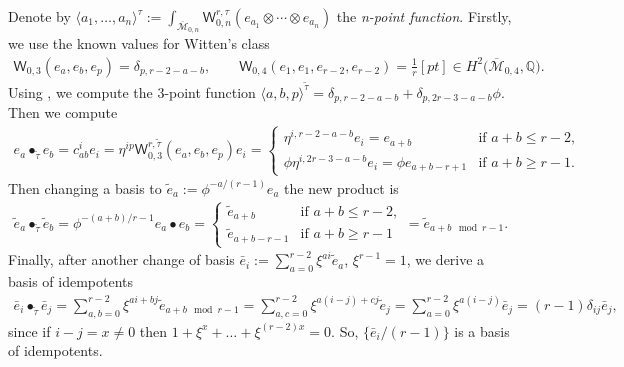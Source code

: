 \documentclass[10pt,a4paper]{amsart}
\def\oM{\overline{\mathcal{M}}}
\def\W{\mathsf{W}}
\numberwithin{equation}{section}
\begin{document}
\begin{Example}
Denote by $\langle a_1,\dots,a_n\rangle^{\tau}:= \int_{\oM_{0,n}}\W_{0,n}^{r,\tau}(e_{a_1} \otimes \cdots \otimes e_{a_n})$ the \emph{n-point function}.
Firstly, we use the known values for Witten's class
\begin{align*}
 \W_{0,3}(e_a,e_b,e_p)=\delta_{p,r-2-a-b}, \qquad \W_{0,4}(e_1,e_1,e_{r-2},e_{r-2})=\frac{1}{r}[pt]\in H^2\big(\oM_{0,4},\mathbb{Q}\big).
\end{align*}
Using \cite[Proposition 4.1]{PPZ16},
we compute the 3-point function
$\langle a,b,p\rangle^{\widetilde{\tau}}\! =\! \delta_{p,r-2-a-b}+\delta_{p,2r-3-a-b}\phi$.
Then we compute
\begin{align*}
e_{a} \bullet_{\widetilde{\tau}} e_{b} = c^{i}_{ab}e_i=\eta^{ip}\W_{0,3}^{r,\widetilde{\tau}}(e_a,e_b,e_p)e_i
=
\begin{cases}
\eta^{i, r-2-a-b} e_i = e_{a+b}& \text{if } a+b \leq r-2 ,\\
\phi \eta^{i, 2r-3-a-b}e_i= \phi e_{a+b-r+1} & \text{if } a+b \geq r-1.
\end{cases}
\end{align*}
Then changing a basis to $\widetilde{e}_a:=\phi ^{-a/(r-1)}e_a$ the new product is
\begin{align*}
\widetilde{e}_a \bullet_{\widetilde{\tau}} \widetilde{e}_b =
\phi^{-(a+b)/r-1} e_a \bullet e_b =
\begin{cases}
\widetilde{e}_{a+b} & \text{if } a+b\leq r-2,\\
\widetilde{e}_{a+b-r-1}& \text{if } a+b\geq r-1
\end{cases}
=
\widetilde{e}_{a+b \mod r-1}.
\end{align*}
Finally, after another change of basis $\bar{e}_i :=\sum^{r-2}_{a=0} \xi ^{a i} \widetilde{e}_a$, $\xi^{r-1} =1$, we derive a basis of idempo\-tents
\begin{align*}
\bar{e}_i \bullet_{\widetilde{\tau}} \bar{e}_j =
\sum_{a,b=0}^{r-2} \xi^{a i +b j}\widetilde{e}_{a+b \mod r-1}=
\sum_{a,c=0}^{r-2}\xi^{a(i-j)+c j}\widetilde{e}_j=
\sum^{r-2}_{a=0} \xi ^{a(i-j)}\bar{e}_{j} = (r-1)\delta_{ij}\bar{e}_{j},
\end{align*}
since if $i-j = x\neq 0$ then $1+\xi^{x}+\dots + \xi ^{(r-2)x} = 0$. So, $\{\bar{e}_{i}/(r-1)\}$ is a basis of idempotents.
\end{Example}
\end{document}
